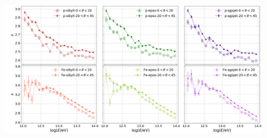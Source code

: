 \documentclass[12pt,letterpaper]{report}
\begin{document}
		\begin{figure}[H] \label{fig:theta_nkgs}
		\includegraphics[width=\textwidth]{Figuras/theta_nkgs}
		\end{figure}

\singlespacing
\end{document}
